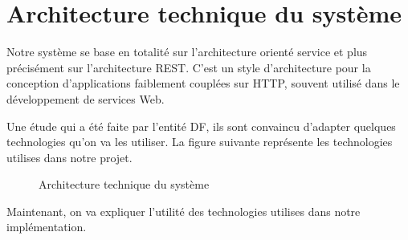 \section{Architecture technique du syst\`eme}

Notre syst\`eme se base en totalit\'e sur l'architecture orient\'e service et plus pr\'ecis\'ement sur l'architecture \gls{REST}. C'est un style d'architecture pour la conception d'applications faiblement coupl\'ees sur \gls{HTTP}, souvent utilis\'e dans le d\'eveloppement de services Web.

Une \'etude qui a \'et\'e faite par l'entit\'e \gls{DF}, ils sont convaincu d'adapter quelques technologies qu'on va les utiliser. La figure suivante repr\'esente les technologies utilises dans notre projet.

\begin{figure}[H]
	\caption{\label{fig:my-label} Architecture technique du syst\`eme}
\end{figure}

Maintenant, on va expliquer l'utilit\'e des technologies utilises dans notre impl\'ementation. 

